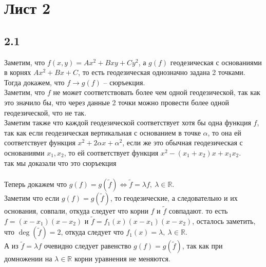\newpage		
	\section*{Лист 2}
		\subsection*{2.1}
		Заметим, что $f(x,y) = Ax^2 + Bxy + Cy^2$, а $g(f)$ геодезическая с основаниями в корнях $Ax^2 + Bx + C$, то есть геодезическая однозначно задана 2 точками.\\
		Тогда докажем, что $f \to g(f)$ -- сюръекция.\\
		Заметим, что $f$ не может соответствовать более чем одной геодезической, так как это значило бы, что через данные 2 точки можно провести более одной геодезической, что не так.\\
		Заметим также что каждой геодезической соответствует хотя бы одна функция $f$, так как если геодезическая вертикальная с основанием в точке $\alpha$, то она ей соответствует функция $x^2 + 2\alpha x + \alpha^2$, если же это обычная геодезическая с основаниями $x_1, x_2$, то ей соответствует функция $x^2 - (x_1 + x_2)x + x_1x_2$.\\
		так мы доказали что это сюръекция\\
		\\
		Теперь докажем что $g(f) = g(\tilde{f}) \Leftrightarrow \tilde{f} = \lambda f,\ \lambda \in \mathbb{R}$.\\
		Заметим что если $g(f) = g(\tilde{f})$, то геодезические, а следовательно и их основания, совпали, откуда следует что корни $f$ и $\tilde{f}$ совпадают. то есть $f = (x - x_1)(x - x_2)$ и $\tilde{f} = f_1(x)(x - x_1)(x - x_2)$, осталось заметить, что $\deg(\tilde{f}) = 2$, откуда следует что $f_1(x) = \lambda,\ \lambda \in \mathbb{R}$.\\
		А из $\tilde{f} = \lambda f$ очевидно следует равенство $g(f) = g(\tilde{f})$, так как при домножении на $\lambda \in \mathbb{R}$ корни уравнения не меняются.
		
